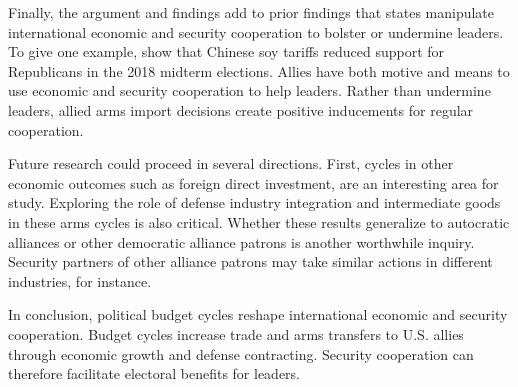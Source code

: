 \documentclass[12pt]{article}
\begin{document}
Finally, the argument and findings add to prior findings that states manipulate international economic and security cooperation to bolster or undermine leaders. 
To give one example, \citet{ChyzhUrbatsch2021} show that Chinese soy tariffs reduced support for Republicans in the 2018 midterm elections. 
Allies have both motive and means to use economic and security cooperation to help leaders. 
Rather than undermine leaders, allied arms import decisions create positive inducements for regular cooperation.


Future research could proceed in several directions. 
First, cycles in other economic outcomes such as foreign direct investment, are an interesting area for study. 
Exploring the role of defense industry integration and intermediate goods in these arms cycles is also critical.
Whether these results generalize to autocratic alliances or other democratic alliance patrons is another worthwhile inquiry. 
Security partners of other alliance patrons may take similar actions in different industries, for instance.


In conclusion, political budget cycles reshape international economic and security cooperation.
Budget cycles increase trade and arms transfers to U.S. allies through economic growth and defense contracting.
Security cooperation can therefore facilitate electoral benefits for leaders. 


\newpage
\singlespace
 
 
\end{document}

